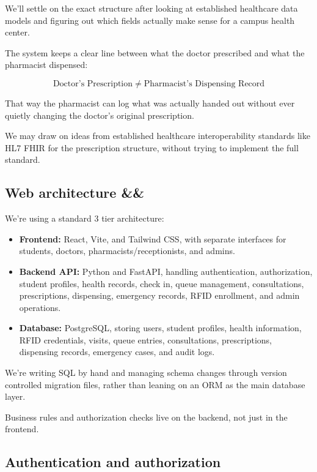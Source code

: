 \documentclass[11pt,a4paper]{article}
\newcommand{\BvrHint}[1]{%
  \ifx&#1&%
  \else
    {\normalfont\normalsize\itshape\hfill #1}%
  \fi}
\begin{document}
We'll settle on the exact structure after looking at established healthcare data models and figuring out which fields actually make sense for a campus health center.

The system keeps a clear line between what the doctor prescribed and what the pharmacist dispensed:

\[
\text{Doctor's Prescription}
\;\neq\;
\text{Pharmacist's Dispensing Record}
\]

That way the pharmacist can log what was actually handed out without ever quietly changing the doctor's original prescription.

We may draw on ideas from established healthcare interoperability standards like HL7 FHIR for the prescription structure, without trying to implement the full standard.

\subsection{Web architecture \BvrHint{}}

We're using a standard 3 tier architecture:

\begin{itemize}
    \item \textbf{Frontend:} React, Vite, and Tailwind CSS, with separate interfaces for students, doctors, pharmacists/receptionists, and admins.
    \item \textbf{Backend API:} Python and FastAPI, handling authentication, authorization, student profiles, health records, check in, queue management, consultations, prescriptions, dispensing, emergency records, RFID enrollment, and admin operations.
    \item \textbf{Database:} PostgreSQL, storing users, student profiles, health information, RFID credentials, visits, queue entries, consultations, prescriptions, dispensing records, emergency cases, and audit logs.
\end{itemize}

We're writing SQL by hand and managing schema changes through version controlled migration files, rather than leaning on an ORM as the main database layer.

Business rules and authorization checks live on the backend, not just in the frontend.

\subsection{Authentication and authorization}
\end{document}
